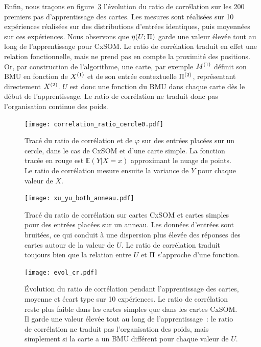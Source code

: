 \documentclass[../main]{subfiles}
\begin{document}
Enfin, nous traçons en figure~\ref{fig:cr_evol} l'évolution du ratio de corrélation sur les 200 premiers pas d'apprentissage des cartes. 
Les mesures sont réalisées sur 10 expériences réalisées sur des distributions d'entrées identiques, puis moyennées sur ces expériences.
Nous observons que $\eta(U;\Pi)$ garde une valeur élevée tout au long de l'apprentissage pour CxSOM.
Le ratio de corrélation traduit en effet une relation fonctionnelle, mais ne prend pas en compte la proximité des positions. 
Or, par construction de l'algorithme, une carte, par exemple $M^{({1})}$ définit son BMU en fonction de $X^{({1})}$ et de son entrée contextuelle $\Pi^{({2})}$, représentant directement $X^{({2})}$. $U$ est donc une fonction du BMU dans chaque carte dès le début de l'apprentissage. Le ratio de corrélation ne traduit donc pas l'organisation continue des poids.

\begin{figure}
    \centering\texttt{[image: correlation\_ratio\_cercle0.pdf]}
    \caption{Tracé du ratio de corrélation et de $\varphi$ sur des entrées placées sur un cercle, dans le cas de CxSOM et d'une carte simple. La fonction tracée en rouge est $\mathbb{E}(Y|X = x)$ approximant le nuage de points. Le ratio de corrélation mesure ensuite la variance de $Y$ pour chaque valeur de $X$. \label{fig:cr_xp}}
\end{figure}

\begin{figure}
   \centering \texttt{[image: xu\_yu\_both\_anneau.pdf]}
    \caption{Tracé du ratio de corrélation sur cartes CxSOM et cartes simples pour des entrées placées sur un anneau. Les données d'entrées sont bruitées, ce qui conduit à une dispersion plus élevée des réponses des cartes autour de la valeur de $U$. Le ratio de corrélation traduit toujours bien que la relation entre $U$ et $\Pi$ s'approche d'une fonction. \label{fig:cr_bruit}}
\end{figure}

\begin{figure}
    \texttt{[image: evol\_cr.pdf]}
    \caption{\'Evolution du ratio de corrélation pendant l'apprentissage des cartes, moyenne et écart type sur 10 expériences. Le ratio de corrélation reste plus faible dans les cartes simples que dans les cartes CxSOM. Il garde une valeur élevée tout au long de l'apprentissage~: le ratio de corrélation ne traduit pas l'organisation des poids, mais simplement si la carte a un BMU différent pour chaque valeur de $U$. \label{fig:cr_evol}}
\end{figure}
\end{document}

